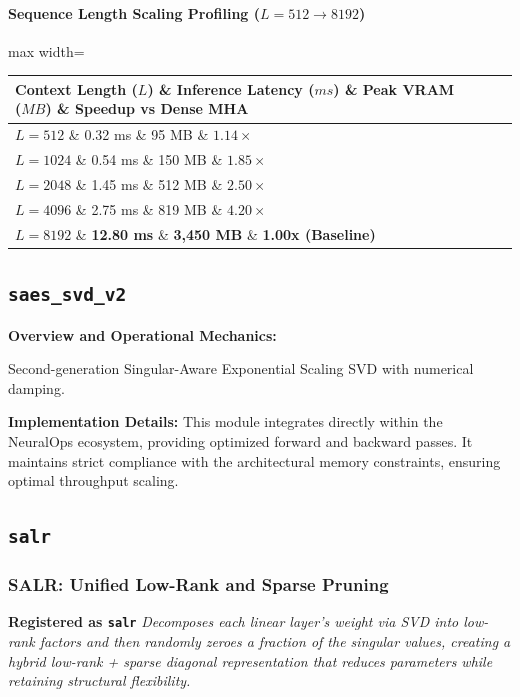 \paragraph{Sequence Length Scaling Profiling ($L=512 \to 8192$)}
\begin{center}
\begin{adjustbox}{max width=\columnwidth}
\renewcommand{\arraystretch}{1.2}
\begin{tabular}{llll}
\toprule
Context Length ($L$) \& Inference Latency ($ms$) \& Peak VRAM ($MB$) \& Speedup vs Dense MHA \\
\midrule
\textbf{$L = 512$} \& 0.32 ms \& 95 MB \& $1.14\times$ \\
\textbf{$L = 1024$} \& 0.54 ms \& 150 MB \& $1.85\times$ \\
\textbf{$L = 2048$} \& 1.45 ms \& 512 MB \& $2.50\times$ \\
\textbf{$L = 4096$} \& 2.75 ms \& 819 MB \& $4.20\times$ \\
\textbf{$L = 8192$} \& \textbf{12.80 ms} \& \textbf{3,450 MB} \& \textbf{1.00x (Baseline)} \\


\bottomrule
\end{tabular}
\end{adjustbox}
\end{center}

\subsection{\texttt{saes\_svd\_v2}}
\textbf{Overview and Operational Mechanics:}

Second-generation Singular-Aware Exponential Scaling SVD with numerical damping.

\textbf{Implementation Details:}
This module integrates directly within the NeuralOps ecosystem, providing optimized forward and backward passes. It maintains strict compliance with the architectural memory constraints, ensuring optimal throughput scaling.

\subsection{\texttt{salr}}
\subsubsection*{SALR: Unified Low-Rank and Sparse Pruning}

\textbf{Registered as \texttt{salr}}
\textit{Decomposes each linear layer's weight via SVD into low-rank factors and then randomly zeroes a fraction of the singular values, creating a hybrid low-rank + sparse diagonal representation that reduces parameters while retaining structural flexibility.}


